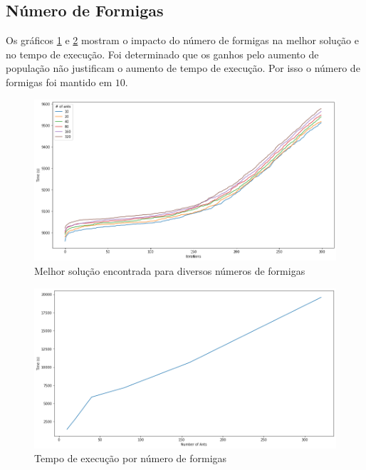 \documentclass[10pt,twocolumn,letterpaper]{article}
\begin{document}
\subsection{Número de Formigas}

Os gráficos \ref{fig:popbest} e \ref{fig:poptime} mostram o impacto do número de formigas na melhor solução e no tempo de execução. Foi determinado que os ganhos pelo aumento de população não justificam o aumento de tempo de execução. Por isso o número de formigas foi mantido em $10$.

\begin{figure}[H]
   \begin{center}
      \includegraphics[width=\linewidth]{popbest}
   \end{center}
   \caption{Melhor solução encontrada para diversos números de formigas}
   \label{fig:popbest}
\end{figure}

\begin{figure}[H]
   \begin{center}
      \includegraphics[width=\linewidth]{poptime}
   \end{center}
   \caption{Tempo de execução por número de formigas}
   \label{fig:poptime}
\end{figure}
\end{document}
